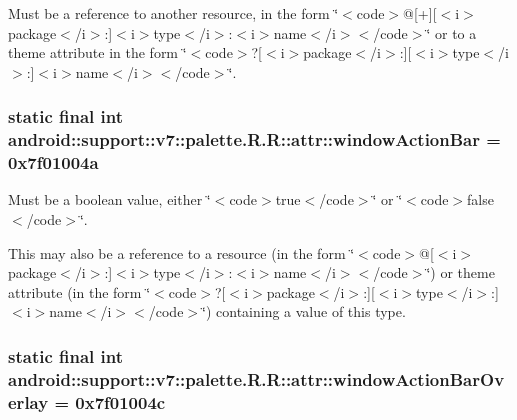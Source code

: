 Must be a reference to another resource, in the form \char`\"{}$<$code$>$@\mbox{[}+\mbox{]}\mbox{[}$<$i$>$package$<$/i$>$:\mbox{]}$<$i$>$type$<$/i$>$:$<$i$>$name$<$/i$>$$<$/code$>$\char`\"{} or to a theme attribute in the form \char`\"{}$<$code$>$?\mbox{[}$<$i$>$package$<$/i$>$:\mbox{]}\mbox{[}$<$i$>$type$<$/i$>$:\mbox{]}$<$i$>$name$<$/i$>$$<$/code$>$\char`\"{}. \hypertarget{classandroid_1_1support_1_1v7_1_1palette_1_1_r_1_1attr_71e2b64e084d4b76d675dada45b9ac8b}{
\subsubsection[{windowActionBar}]{\setlength{\rightskip}{0pt plus 5cm}static final int android::support::v7::palette.R.R::attr::windowActionBar = 0x7f01004a}}
\label{classandroid_1_1support_1_1v7_1_1palette_1_1_r_1_1attr_71e2b64e084d4b76d675dada45b9ac8b}


Must be a boolean value, either \char`\"{}$<$code$>$true$<$/code$>$\char`\"{} or \char`\"{}$<$code$>$false$<$/code$>$\char`\"{}. 

This may also be a reference to a resource (in the form \char`\"{}$<$code$>$@\mbox{[}$<$i$>$package$<$/i$>$:\mbox{]}$<$i$>$type$<$/i$>$:$<$i$>$name$<$/i$>$$<$/code$>$\char`\"{}) or theme attribute (in the form \char`\"{}$<$code$>$?\mbox{[}$<$i$>$package$<$/i$>$:\mbox{]}\mbox{[}$<$i$>$type$<$/i$>$:\mbox{]}$<$i$>$name$<$/i$>$$<$/code$>$\char`\"{}) containing a value of this type. \hypertarget{classandroid_1_1support_1_1v7_1_1palette_1_1_r_1_1attr_82927d28226c8205d1f14897fedcba2a}{
\subsubsection[{windowActionBarOverlay}]{\setlength{\rightskip}{0pt plus 5cm}static final int android::support::v7::palette.R.R::attr::windowActionBarOverlay = 0x7f01004c}}
\label{classandroid_1_1support_1_1v7_1_1palette_1_1_r_1_1attr_82927d28226c8205d1f14897fedcba2a}


